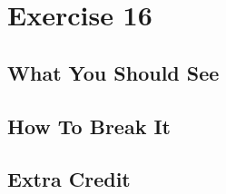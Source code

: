 \chapter{Exercise 16}


\section{What You Should See}


\section{How To Break It}


\section{Extra Credit}




